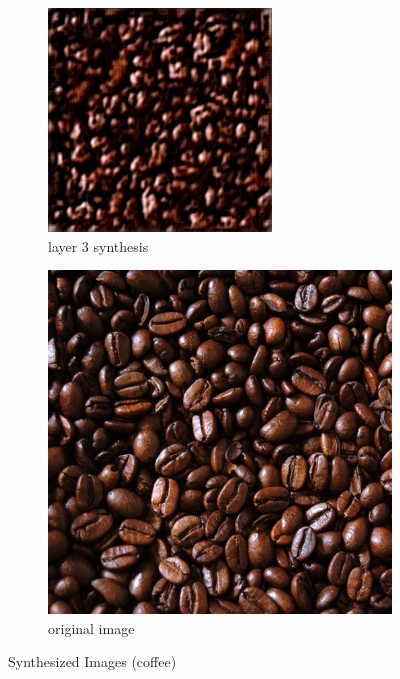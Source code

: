 \documentclass[11pt, oneside]{article}   	%
\begin{document}
\begin{figure}[H]
    \begin{subfigure}[b]{0.45\textwidth}
        \includegraphics[width=\textwidth]{figure/coffee/layer_03_001}
        \caption{layer 3 synthesis}
    \end{subfigure}
        \begin{subfigure}[b]{0.45\textwidth}
        \includegraphics[width=\textwidth]{figure/coffee/layer_00_001}
        \caption{original image}
    \end{subfigure}
    \caption{Synthesized Images (coffee)}\label{fig:coffees}
\end{figure}
\end{document}
